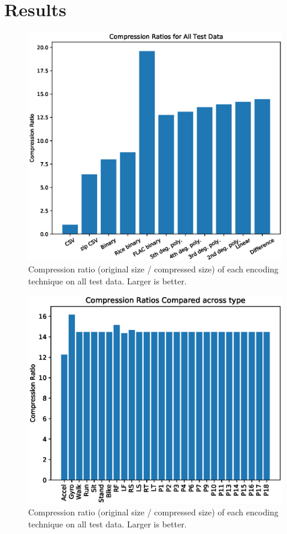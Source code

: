 \documentclass[journal]{IEEEtran}
\begin{document}
\section{Results}


\begin{figure}

  \includegraphics[width=\linewidth]{prelim_results.eps}
  \caption{Compression ratio (original size / compressed size) of each encoding technique on all test data. Larger is better.}
  \label{fig:main_results}
  
\end{figure}
\begin{figure}

  \includegraphics[width=\linewidth]{results_type_split.eps}
  \caption{Compression ratio (original size / compressed size) of each encoding technique on all test data. Larger is better.}
  \label{fig:split_results}
  
\end{figure}
\end{document}
